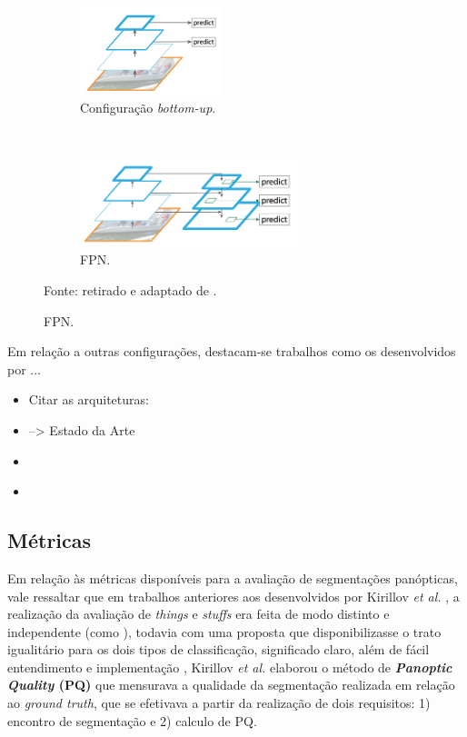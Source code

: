 \begin{figure}[H]
   \caption{Extrações de características e FPN.}
   \centering
   \label{panoptic:fig:2}
    \begin{subfigure}[t]{0.45\textwidth}
        \centering
        \includegraphics[height=1in]{recursos/imagens/bottom-up.png}
        \caption{Configuração \textit{bottom-up}.}
        \label{panoptic:fig:2.1}
    \end{subfigure}%
    ~ 
    \begin{subfigure}[t]{0.45\textwidth}
        \centering
        \includegraphics[height=1in]{recursos/imagens/FPN.png}
        \caption{FPN.}
        \label{panoptic:fig:2.2}
    \end{subfigure}%

    Fonte: retirado e adaptado de \cite{Lin2016}.
\end{figure}
Em relação a outras configurações, destacam-se trabalhos como os desenvolvidos por ...
\begin{itemize}
    \item Citar as arquiteturas:
        \item \cite{Mohan2020} --> Estado da Arte
        \item \cite{DeGeus2019a}
        \item \cite{Xiong2019}
\end{itemize}

\subsection{Métricas}
Em relação às métricas disponíveis para a avaliação de segmentações panópticas, vale ressaltar que em trabalhos anteriores aos desenvolvidos por Kirillov \textit{et al.} \cite{Kirillov2019a}, a realização da avaliação de \textit{things} e \textit{stuffs} era feita de modo distinto e independente (como \cite{Sun2014, Yao2012}), todavia com uma proposta que disponibilizasse o trato igualitário para os dois tipos de classificação, significado claro, além de fácil entendimento e implementação , Kirillov \textit{et al.} \cite{Kirillov2019a} elaborou o método de \textbf{\textit{Panoptic Quality} (PQ)} que mensurava a qualidade da segmentação realizada em relação ao \textit{ground truth}, que se efetivava  a partir da realização de dois requisitos: 1) encontro de segmentação e  2) calculo de PQ.

